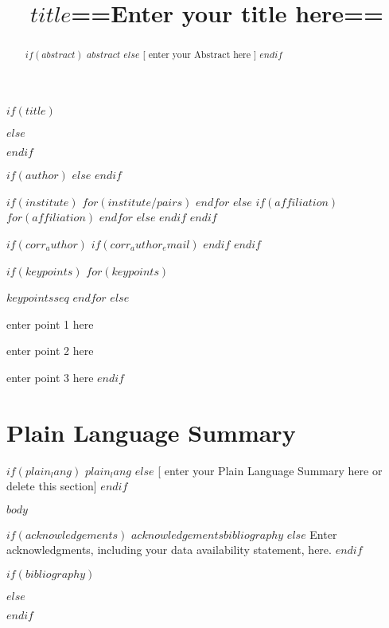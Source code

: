\documentclass[draft]{agujournal2019}
\begin{document}
$if(title)$
\title{$title$}
$else$
\title{==Enter your title here==}
$endif$

$if(author)$
$else$
$endif$

$if(institute)$
$for(institute/pairs)$
$endfor$
$else$
$if(affiliation)$
$for(affiliation)$
$endfor$
$else$
$endif$
$endif$

$if(corr_author)$
$if(corr_author_email)$
$endif$
$endif$


\begin{keypoints}
$if(keypoints)$
$for(keypoints)$
\item $keypoints$$seq$
$endfor$
$else$
\item enter point 1 here
\item enter point 2 here
\item enter point 3 here
$endif$
\end{keypoints}



\begin{abstract}
$if(abstract)$
$abstract$
$else$
[ enter your Abstract here ]
$endif$
\end{abstract}

\section*{Plain Language Summary}
$if(plain_lang)$
$plain_lang$
$else$
[ enter your Plain Language Summary here or delete this section]
$endif$


$body$


\acknowledgments
$if(acknowledgements)$
$acknowledgements$$bibliography$
$else$
Enter acknowledgments, including your data availability statement, here.
$endif$



$if(bibliography)$

$else$

$endif$
\end{document}
